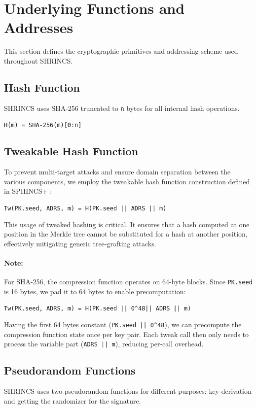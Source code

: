 \section{Underlying Functions and Addresses}
This section defines the cryptographic primitives and addressing scheme used throughout SHRINCS.
\subsection{Hash Function}

SHRINCS uses SHA-256 truncated to \texttt{n} bytes for all internal hash operations. 
\begin{center}
\texttt{H(m) = SHA-256(m)[0:n]}
\end{center}

\subsection{Tweakable Hash Function}
To prevent multi-target attacks and ensure domain separation between the various components, we employ the tweakable hash function construction defined in SPHINCS+ \cite{sphincsplus_paper2019}:

\begin{center}
\texttt{Tw(PK.seed, ADRS, m) = H(PK.seed || ADRS || m)}
\end{center}

This usage of tweaked hashing is critical. It ensures that a hash computed at one position in the Merkle tree cannot be substituted for a hash at another position, effectively mitigating generic tree-grafting attacks.

\paragraph{Note:} For SHA-256, the compression function operates on 64-byte blocks. Since \texttt{PK.seed} is 16 bytes, we pad it to 64 bytes to enable precomputation:

\begin{center}
    \texttt{Tw(PK.seed, ADRS, m) = H(PK.seed || 0\string^48|| ADRS || m)}
\end{center}

Having the first 64 bytes constant (\texttt{PK.seed || 0\string^48}), we can precompute the compression function state once per key pair. Each tweak call then only needs to process the variable part (\texttt{ADRS || m}), reducing per-call overhead.

\subsection{Pseudorandom Functions}
SHRINCS uses two pseudorandom functions for different purposes: key derivation and getting the randomizer for the signature. 


